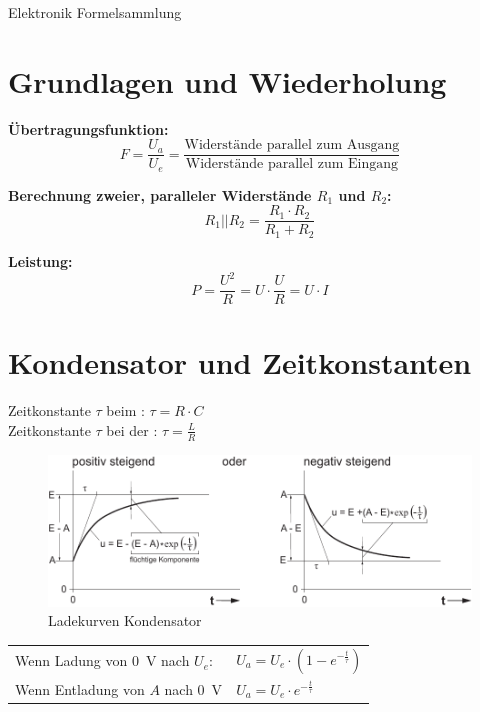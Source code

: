 \documentclass[a5paper, 12pt]{scrartcl}
\begin{document}
\begin{center}
  \huge Elektronik Formelsammlung
\end{center}

\section{Grundlagen und Wiederholung}

\begin{minipage}{.45\textwidth}
\textbf{Übertragungsfunktion:} \[F = \frac{U_a}{U_e} = \frac{\text{Widerstände parallel zum Ausgang}}{\text{Widerstände parallel zum Eingang}}\]

\textbf{Berechnung zweier, paralleler Widerstände \(R_1\) und \(R_2\):} \[R_1 || R_2 = \frac{R_1 \cdot R_2}{R_1 + R_2}\]

\textbf{Leistung:} \[P = \frac{U^2}{R} = U \cdot \frac{U}{R} = U \cdot I\]
\end{minipage}\hfill\vline\hfill%
\begin{minipage}{.45\textwidth}
  \lipsum[4]
\end{minipage}

\section{Kondensator und Zeitkonstanten}

Zeitkonstante \(\tau\) beim : \dotfill \(\tau = R \cdot C\)\\
Zeitkonstante \(\tau\) bei der : \dotfill \(\tau = \frac{L}{R}\)\\

\begin{figure}[H]
  \centering
  \includegraphics[width=.7\textwidth]{LadekurveKondensator}
  \caption{Ladekurven Kondensator }
\end{figure}

\begin{center}
  \begin{tabular}{ll}
    \toprule
    Wenn Ladung von \SI{0}{\volt} nach \(U_e\): & \(U_a = U_e \cdot (1 - e^{-\frac{t}{\tau}})\)\\
    Wenn Entladung von \(A\) nach \SI{0}{\volt} & \(U_a = U_e \cdot e^{-\frac{t}{\tau}}\)\\
    \bottomrule
  \end{tabular}
\end{center}
\end{document}

